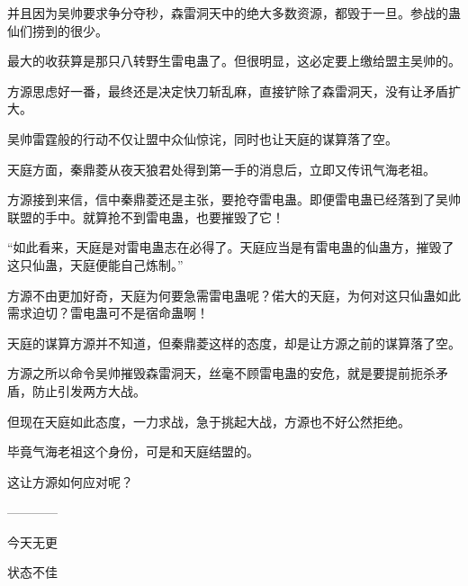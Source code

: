 \begin{this_body}
并且因为吴帅要求争分夺秒，森雷洞天中的绝大多数资源，都毁于一旦。参战的蛊仙们捞到的很少。

最大的收获算是那只八转野生雷电蛊了。但很明显，这必定要上缴给盟主吴帅的。

方源思虑好一番，最终还是决定快刀斩乱麻，直接铲除了森雷洞天，没有让矛盾扩大。

吴帅雷霆般的行动不仅让盟中众仙惊诧，同时也让天庭的谋算落了空。

天庭方面，秦鼎菱从夜天狼君处得到第一手的消息后，立即又传讯气海老祖。

方源接到来信，信中秦鼎菱还是主张，要抢夺雷电蛊。即便雷电蛊已经落到了吴帅联盟的手中。就算抢不到雷电蛊，也要摧毁了它！

“如此看来，天庭是对雷电蛊志在必得了。天庭应当是有雷电蛊的仙蛊方，摧毁了这只仙蛊，天庭便能自己炼制。”

方源不由更加好奇，天庭为何要急需雷电蛊呢？偌大的天庭，为何对这只仙蛊如此需求迫切？雷电蛊可不是宿命蛊啊！

天庭的谋算方源并不知道，但秦鼎菱这样的态度，却是让方源之前的谋算落了空。

方源之所以命令吴帅摧毁森雷洞天，丝毫不顾雷电蛊的安危，就是要提前扼杀矛盾，防止引发两方大战。

但现在天庭如此态度，一力求战，急于挑起大战，方源也不好公然拒绝。

毕竟气海老祖这个身份，可是和天庭结盟的。

这让方源如何应对呢？

------------

今天无更

状态不佳

\end{this_body}

